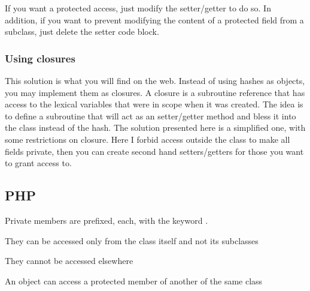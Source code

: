 \documentclass{KodeBook}
\begin{document}


If you want a protected access, just modify the setter/getter to do so. 
In addition, if you want to prevent modifying the content of a protected field from a subclass, just delete the setter code block.

\subsubsection{Using closures} 

This solution is what you will find on the web. %
Instead of using hashes as objects, you may implement them as closures. 
A closure is a subroutine reference that has access to the lexical variables that were in scope when it was created.
The idea is to define a subroutine that will act as an setter/getter method and bless it into the class instead of the hash. 
The solution presented here is a simplified one, with some restrictions on closure. 
Here I forbid access outside the class to make all fields private, then you can create second hand setters/getters for those you want to grant access to.
 



\subsection{PHP}

Private members are prefixed, each, with the keyword .



They can be accessed only from the class itself and not its subclasses



They cannot be accessed elsewhere



An object can access a protected member of another of the same class


\end{document}
